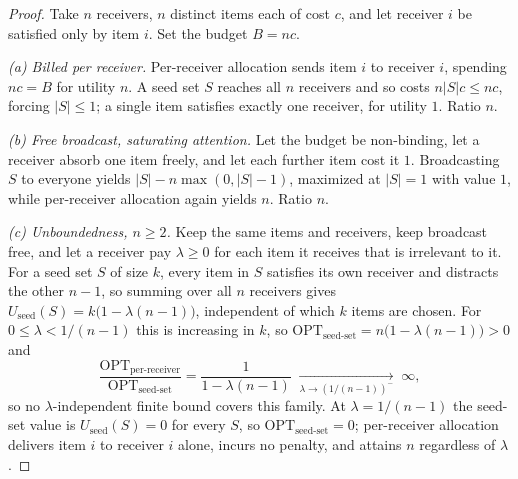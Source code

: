 \documentclass[sigconf,anonymous]{aamas}
\theoremstyle{remark}
\begin{document}
\begin{proof}
Take $n$ receivers, $n$ distinct items each of cost $c$, and let
receiver $i$ be satisfied only by item $i$. Set the budget $B = nc$.

\emph{(a) Billed per receiver.} Per-receiver allocation sends item $i$
to receiver $i$, spending $nc = B$ for utility $n$. A seed set $S$
reaches all $n$ receivers and so costs $n|S|c \le nc$, forcing
$|S| \le 1$; a single item satisfies exactly one receiver, for
utility $1$. Ratio $n$.

\emph{(b) Free broadcast, saturating attention.} Let the budget be
non-binding, let a receiver absorb one item freely, and let each
further item cost it $1$. Broadcasting $S$ to everyone yields
$|S| - n\max(0,|S|-1)$, maximized at $|S|=1$ with value $1$, while
per-receiver allocation again yields $n$. Ratio $n$.

\emph{(c) Unboundedness, $n \ge 2$.} Keep the same items and
receivers, keep broadcast free, and let a receiver pay $\lambda \ge 0$
for each item it receives that is irrelevant to it. For a seed set $S$
of size $k$, every item in $S$ satisfies its own receiver and
distracts the other $n-1$, so summing over all $n$ receivers gives
$U_{\text{seed}}(S) = k\bigl(1-\lambda(n-1)\bigr)$, independent of
which $k$ items are chosen. For $0 \le \lambda < 1/(n-1)$ this is
increasing in $k$, so $\mathrm{OPT}_{\text{seed-set}} =
n\bigl(1-\lambda(n-1)\bigr) > 0$ and
\[
\frac{\mathrm{OPT}_{\text{per-receiver}}}{\mathrm{OPT}_{\text{seed-set}}}
= \frac{1}{1-\lambda(n-1)} \;\xrightarrow[\lambda \to (1/(n-1))^{-}]{}\; \infty,
\]
so no $\lambda$-independent finite bound covers this family. At
$\lambda = 1/(n-1)$ the seed-set value is $U_{\text{seed}}(S) = 0$ for
every $S$, so $\mathrm{OPT}_{\text{seed-set}} = 0$; per-receiver
allocation delivers item $i$ to receiver $i$ alone, incurs no penalty,
and attains $n$ regardless of $\lambda$.
\end{proof}
\end{document}
